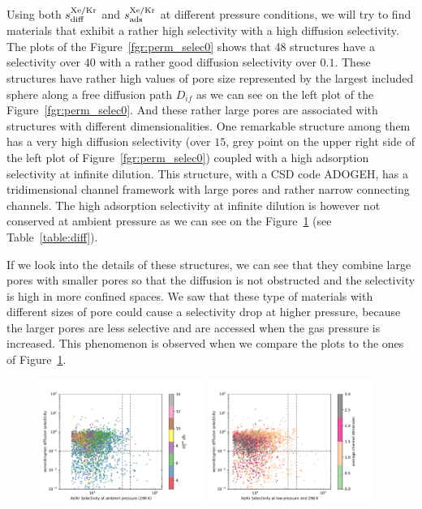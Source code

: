 \documentclass[main]{subfiles}
\begin{document}
Using both $s^{\text{Xe/Kr}}_{\text{diff}}$ and $s^{\text{Xe/Kr}}_{\text{ads}}$ at different pressure conditions, we will try to find materials that exhibit a rather high selectivity with a high diffusion selectivity. The plots of the Figure~\ref{fgr:perm_selec0} shows that 48 structures have a selectivity over $40$ with a rather good diffusion selectivity over $0.1$. These structures have rather high values of pore size represented by the largest included sphere along a free diffusion path $D_{if}$ as we can see on the left plot of the Figure~\ref{fgr:perm_selec0}. And these rather large pores are associated with structures with different dimensionalities.
One remarkable structure among them has a very high diffusion selectivity (over $15$, grey point on the upper right side of the left plot of Figure~\ref{fgr:perm_selec0}) coupled with a high adsorption selectivity at infinite dilution. This structure, with a CSD code ADOGEH\cite{Peikert_2012}, has a tridimensional channel framework with large pores and rather narrow connecting channels. The high adsorption selectivity at infinite dilution is however not conserved at ambient pressure as we can see on the Figure~\ref{fgr:perm_selec2080}  (see Table~\ref{table:diff}).

If we look into the details of these structures, we can see that they combine large pores with smaller pores so that the diffusion is not obstructed and the selectivity is high in more confined spaces. We saw that these type of materials with different sizes of pore could cause a selectivity drop at higher pressure, because the larger pores are less selective and are accessed when the gas pressure is increased. This phenomenon is observed when we compare the plots to the ones of Figure~\ref{fgr:perm_selec2080}.

\begin{figure}[ht]
  \centering
    \includegraphics[width=0.48\textwidth]{figures/5-diffusion/diff_D_xekr-s2080-lcd.pdf}
    \includegraphics[width=0.48\textwidth]{figures/5-diffusion/diff_D_xekr-s2080-chandim.pdf}
    \caption{}\label{fgr:perm_selec2080}
\end{figure}
\end{document}
